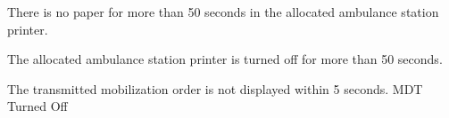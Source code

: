   \startkaosspec  
  	 {There is no paper for more than 50 seconds in the allocated ambulance station printer.}
  \stopkaosspec
  
  \startkaosspec
  	 {The allocated ambulance station printer is turned off for more than 50 seconds.}
  \stopkaosspec
  
  
    {}
  
  \startkaosspec
  	 {The transmitted mobilization order is not displayed within 5 seconds.}
  	 {MDT Turned Off}
  \stopkaosspec

\stopsubsection
